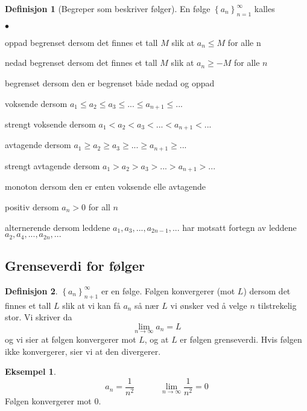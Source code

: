 \documentclass[11pt]{article}
\theoremstyle{definition}
\newtheorem{mindef}{Definisjon}[section]
\newenvironment{fmindef}
{\begin{mdframed}[style=minstil]\begin{mindef}}
		{\end{mindef}\end{mdframed}}
\theoremstyle{definition}
\newtheorem{mitteks}{Eksempel}[section]
\theoremstyle{definition}
\theoremstyle{definition}
\theoremstyle{definition}
\theoremstyle{definition}
\begin{document}
	    \begin{fmindef}[Begreper som beskriver følger] \leavevmode
	    	
	    	En følge \( \left\lbrace a_n\right\rbrace  ^{\infty}_{n=1}\) kalles
	    	\begin{list}{\(\bullet\)} \leavevmode
	    		\item oppad begrenset dersom det finnes et tall \(M\) slik at \(a_n\leq M \) for alle n 
	    		\item nedad begrenset dersom det finnes et tall \(M\) slik at \(a_n\ge -M\) for alle \(n\)
	    		\item begrenset dersom den er begrenset både nedad og oppad
	    		\item voksende dersom \(a_1\leq a_2 \leq a_3 \leq ... \leq a_{n+1} \leq ...\)
	    		\item strengt voksende dersom \(a_1 < a_2 < a_3 < ... < a_{n+1} < ...\)
	    		\item avtagende dersom \(a_1\geq a_2 \geq a_3 \geq ... \geq a_{n+1} \geq ...\)
	    		\item strengt avtagende dersom \(a_1 > a_2 > a_3 > ... > a_{n+1} > ...\)
	    		\item monoton dersom den er enten voksende elle avtagende
	    		\item positiv dersom \(a_n>0\) for all \(n\)
	    		\item alternerende dersom leddene \(a_1,a_3,...,a_{2n-1}, ...\) har motsatt fortegn av leddene \(a_2,a_4,...,a_{2n},...\)
	    	\end{list}
	    \end{fmindef}
	    
	    
		\newpage
		
		\subsection{Grenseverdi for følger}
		\begin{fmindef}
			\(\left\lbrace a_n \right\rbrace^{\infty}_{n+1} \) er en følge. Følgen konvergerer (mot \(L\)) dersom det finnes et tall \(L\) slik at vi kan få \(a_n\) så nær \(L\) vi ønsker ved å velge \(n\) tilstrekelig stor. Vi skriver da \[\lim\limits_{n\rightarrow \infty}a_n=L \]
			og vi sier at følgen konvergerer mot \(L\), og at \(L\) er følgen grenseverdi. Hvis følgen ikke konvergerer, sier vi at den divergerer.
		\end{fmindef}
		
		\begin{mitteks}
			\[	a_n=\dfrac{1}{n^2} \hspace{36pt}
			\lim\limits_{n\rightarrow \infty}\dfrac{1}{n^2}=0\]
			Følgen konvergerer mot 0.
		\end{mitteks}
		
\end{document}
